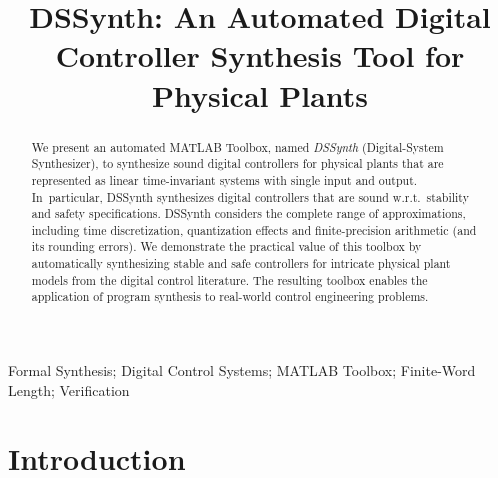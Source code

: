 \documentclass[conference]{IEEEtran}
\begin{document}
\title{DSSynth: An Automated Digital Controller Synthesis Tool for Physical Plants} 

\author{
}

			
\maketitle

\begin{abstract}
%
We present an automated MATLAB Toolbox, named \emph{DSSynth} (Digital-System
Synthesizer), to synthesize sound digital controllers for physical plants
that are represented as linear time-invariant systems with single input and
output.  In~particular, DSSynth synthesizes digital controllers that are
sound w.r.t.~stability and safety specifications.  DSSynth considers the
complete range of approximations, including time discretization,
quantization effects and finite-precision arithmetic (and its rounding
errors).  We demonstrate the practical value of
this toolbox by automatically synthesizing stable and safe controllers for intricate
physical plant models from the digital control literature.
The resulting toolbox enables the application of program synthesis
to real-world control engineering problems.
%
\end{abstract}

%
%
\begin{IEEEkeywords}
Formal Synthesis; Digital Control Systems; MATLAB Toolbox; Finite-Word Length; Verification
\end{IEEEkeywords}

\section{Introduction}
\end{document}
